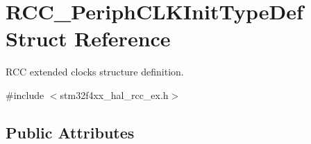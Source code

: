 \hypertarget{struct_r_c_c___periph_c_l_k_init_type_def}{}\section{R\+C\+C\+\_\+\+Periph\+C\+L\+K\+Init\+Type\+Def Struct Reference}
\label{struct_r_c_c___periph_c_l_k_init_type_def}


R\+CC extended clocks structure definition.  




{\ttfamily \#include $<$stm32f4xx\+\_\+hal\+\_\+rcc\+\_\+ex.\+h$>$}

\subsection*{Public Attributes}
